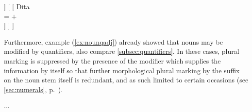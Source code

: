 \a\label{ex:animclashname} %
\ljudge*\begin{forest}
[\anno{\xhead{N}}
	[\anno{Cl}
		[{%
			eng \\
			\ups{\Anim} = $-$ \\
			\ups{\Case} = \Aarg{} \\
		}]
	]
	[
		[{%
			Dita \\
			\ups{\Anim} = $+$ \\
		}]
	]
]
\end{forest}
\xe

Furthermore, example (\ref{ex:nounqadj}) already showed that nouns may be
modified by quantifiers, also compare \autoref{subsec:quantifiers}. In these
cases, plural marking is suppressed by the presence of the modifier which
supplies the information by itself so that further morphological plural marking
by the suffix  on the noun stem itself is redundant, and as such
limited to certain occasions (see \autoref{sec:numerals}, 
p.~\pageref{hundreds}).

...






